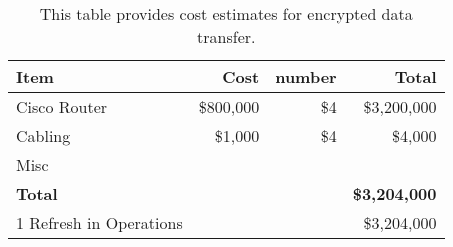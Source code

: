 \tiny \begin{longtable} {|l|r|r|r|} \caption{This table provides cost estimates for encrypted data transfer. \label{tab:ipsec}}\\ 
\hline 
\textbf{Item}&\textbf{Cost}&\textbf{number}&\textbf{Total} \\ \hline
{Cisco Router }&{\$800,000}&{\$4}&{\$3,200,000} \\ \hline
{Cabling}&{\$1,000}&{\$4}&{\$4,000} \\ \hline
{Misc}&&& \\ \hline
\textbf{Total}&\textbf{}&\textbf{}&\textbf{\$3,204,000} \\ \hline
{1 Refresh in Operations}&{}&{}&{\$3,204,000} \\ \hline
\end{longtable} \normalsize
